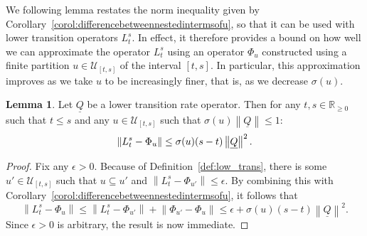 \documentclass[10pt,a4paper]{paper}
\theoremstyle{definition}
\newtheorem{lemma}[theorem]{Lemma}
\newcommand{\reals}{\mathbb{R}}
\newcommand{\realsnonneg}{\reals_{\geq 0}}
\newcommand{\lrate}{\underline{Q}}
\newcommand{\norm}[1]{\left\lVert #1 \right\rVert}
\begin{document}
We following lemma restates the norm inequality given by Corollary~\ref{corol:differencebetweennestedintermsofu}, so that it can be used with lower transition operators $L_t^s$. In effect, it therefore provides a bound on how well we can approximate the operator $L_t^s$ using an operator $\Phi_u$ constructed using a finite partition $u\in\mathcal{U}_{[t,s]}$ of the interval $[t,s]$. In particular, this approximation improves as we take $u$ to be increasingly finer, that is, as we decrease $\sigma(u)$.

\begin{lemma}\label{lemma:limitboundonL}
Let $\lrate$ be a lower transition rate operator. Then for any $t,s\in\realsnonneg$ such that $t\leq s$ and any $u\in\mathcal{U}_{[t,s]}$ such that $\sigma(u)\norm{\lrate}\leq 1$:
\begin{equation*}
\norm{L_t^s-\Phi_{u}}\leq\sigma(u)(s-t)\norm{\lrate}^2.\vspace{5pt}
\end{equation*}
\end{lemma}
\begin{proof}
Fix any $\epsilon>0$. Because of Definition~\ref{def:low_trans}, there is some $u'\in\mathcal{U}_{[t,s]}$ such that $u\subseteq u'$ and $\norm{L_t^s-\Phi_{u'}}\leq\epsilon$. By combining this with Corollary~\ref{corol:differencebetweennestedintermsofu}, it follows that
\begin{equation*}
\norm{L_t^s-\Phi_{u}}
\leq
\norm{L_t^s-\Phi_{u'}}
+
\norm{\Phi_{u'}-\Phi_{u}}
\leq\epsilon+
\sigma(u)(s-t)\norm{\lrate}^2.
\end{equation*}
Since $\epsilon>0$ is arbitrary, the result is now immediate.
\end{proof}
\end{document}
